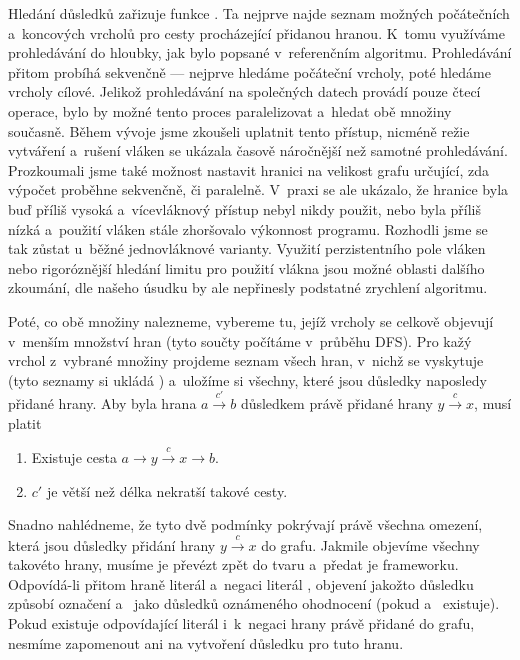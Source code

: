 Hledání důsledků zařizuje funkce . Ta nejprve najde seznam možných počátečních a~koncových vrcholů pro cesty procházející přidanou hranou. K~tomu využíváme prohledávání do hloubky, jak bylo popsané v~referenčním algoritmu. Prohledávání přitom probíhá sekvenčně --- nejprve hledáme počáteční vrcholy, poté hledáme vrcholy cílové. Jelikož prohledávání na společných datech provádí pouze čtecí operace, bylo by možné tento proces paralelizovat a~hledat obě množiny současně. Během vývoje jsme zkoušeli uplatnit tento přístup, nicméně režie vytváření a~rušení vláken  se ukázala časově náročnější než samotné prohledávání. Prozkoumali jsme také možnost nastavit hranici na velikost grafu určující, zda výpočet proběhne sekvenčně, či paralelně. V~praxi se ale ukázalo, že hranice byla buď příliš vysoká a~vícevláknový přístup nebyl nikdy použit, nebo byla příliš nízká a~použití vláken stále zhoršovalo výkonnost programu. Rozhodli jsme se tak zůstat u~běžné jednovláknové varianty. Využití perzistentního pole vláken nebo rigoróznější hledání limitu pro použití vlákna jsou možné oblasti dalšího zkoumání, dle našeho úsudku by ale nepřinesly podstatné zrychlení algoritmu.

Poté, co obě množiny nalezneme, vybereme tu, jejíž vrcholy se celkově objevují v~menším množství hran (tyto součty počítáme v~průběhu DFS). Pro kažý vrchol z~vybrané množiny projdeme seznam všech hran, v~nichž se vyskytuje (tyto seznamy si ukládá ) a~uložíme si všechny, které jsou důsledky naposledy přidané hrany. Aby byla hrana $a \xrightarrow{c'} b$ důsledkem právě přidané hrany $y \xrightarrow{c} x$, musí platit 
\begin{enumerate}
	\item Existuje cesta $a \rightarrow y \xrightarrow{c} x \rightarrow b$.
	\item $c'$ je větší než délka nekratší takové cesty.
\end{enumerate}

Snadno nahlédneme, že tyto dvě podmínky pokrývají právě všechna omezení, která jsou důsledky přidání hrany $y \xrightarrow{c} x$ do grafu. Jakmile objevíme všechny takovéto hrany, musíme je převézt zpět do tvaru  a~předat je frameworku. Odpovídá-li přitom hraně  literál  a~negaci  literál , objevení  jakožto důsledku způsobí označení  a~ jako důsledků oznámeného ohodnocení (pokud  a~ existuje). Pokud existuje odpovídající literál  i~k~negaci hrany právě přidané do grafu, nesmíme zapomenout ani na vytvoření důsledku  pro tuto hranu.


